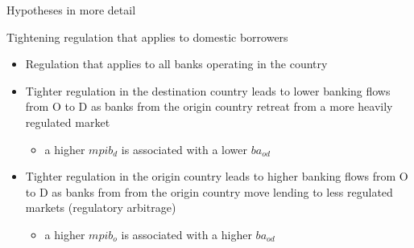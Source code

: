\documentclass{beamer}
\begin{document}

\begin{frame}{Hypotheses in more detail}
\begin{block}{Tightening regulation that applies to domestic borrowers}
\begin{itemize}
\item Regulation that applies to all banks operating in the country
\item Tighter regulation in the destination country leads to lower banking flows from O to D as banks from the origin country retreat from a more heavily regulated market
\begin{itemize}
\item a higher $mpib_{d}$ is associated with a lower $ba_{od}$
\end{itemize}
\item Tighter regulation in the origin country leads to higher banking flows from O to D as banks from from the origin country move lending to less regulated markets (regulatory arbitrage)
\begin{itemize}
\item a higher $mpib_{o}$ is associated with a higher $ba_{od}$
\end{itemize}
\end{itemize}
\end{block}
\end{frame}
\end{document}
